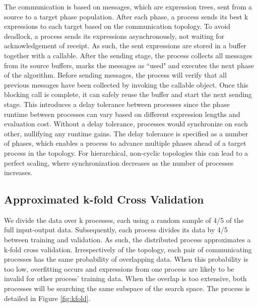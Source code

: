 The communication is based on messages, which are expression trees, sent from a source to a target phase population.
After each phase, a process sends its best k expressions to each target based on the communication topology. To avoid deadlock, a process sends its expressions asynchronously, not waiting for acknowledgement of receipt. As such, the sent expressions are stored in a buffer together with a callable. After the sending stage, the process collects all messages from its source buffers, marks the messages as ``used" and executes the next phase of the algorithm. Before sending messages, the process will verify that all previous messages have been collected by invoking the callable object. Once this blocking call is complete, it can safely reuse the buffer and start the next sending stage. This introduces a delay tolerance between processes since the phase runtime between processes can vary based on different expression lengths and evaluation cost. Without a delay tolerance, processes would synchronize on each other, nullifying any runtime gains. The delay tolerance is specified as a number of phases, which enables a process to advance multiple phases ahead of a target process in the topology. 
For hierarchical, non-cyclic topologies this can lead to a perfect scaling, where synchronization decreases as the number of processes increases.

\subsection{Approximated k-fold Cross Validation}
We divide the data over k processes, each using a random sample of 4/5 of the full input-output data. Subsequently, each process divides its data by 4/5 between training and validation. As such, the distributed process approximates a k-fold cross validation. Irrespectively of the topology, each pair of communicating processes has the same probability of overlapping data. When this probability is too low, overfitting occurs and expressions from one process are likely to be invalid for other process' training data. When the overlap is too extensive, both processes will be searching the same subspace of the search space. The process is detailed in Figure \ref{fig:kfold}.


